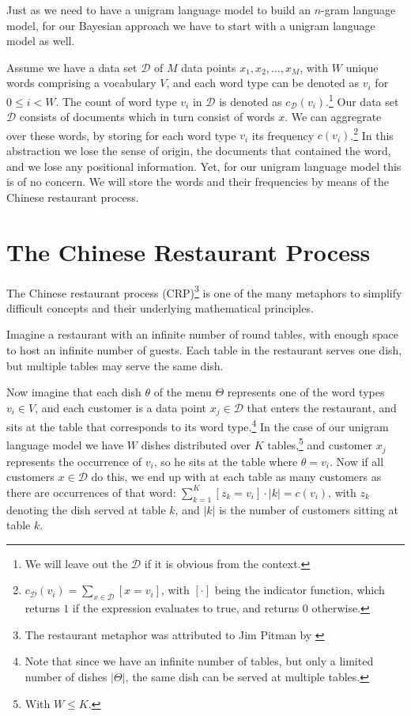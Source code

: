 Just as we need to have a unigram language model to build an $n$-gram language model, for our Bayesian approach we have to start with a unigram language model as well.

Assume we have a data set $\mathcal{D}$ of $M$ data points $x_1, x_2, \ldots, x_M$, with $W$ unique words comprising a vocabulary $V$, and each word type can be denoted as $v_i$ for $0 \leq i < W$. The count of word type $v_i$ in $\mathcal{D}$ is denoted as $c_\mathcal{D}(v_i)$.\footnote{We will leave out the $\mathcal{D}$ if it is obvious from the context.} Our data set $\mathcal{D}$ consists of documents which in turn consist of words $x$. We can aggregrate over these words, by storing for each word type $
v_i$ its frequency $c(v_i)$.\footnote{$c_\mathcal{D}(v_i) = \sum_{x\in\mathcal{D}} [x = v_i]$, with $[\cdot]$ being the indicator function, which returns $1$ if the expression evaluates to true, and returns $0$ otherwise.} In this abstraction we lose the sense of origin, the documents that contained the word, and we lose any positional information. Yet, for our unigram language model this is of no concern. We will store the words and their frequencies by means of the Chinese restaurant process.

\section{The Chinese Restaurant Process}
The Chinese restaurant process (CRP)\footnote{The restaurant metaphor was attributed to Jim Pitman by \cite{Aldous1985Exchangeability}} is one of the many metaphors to simplify difficult concepts and their underlying mathematical principles. 

Imagine a restaurant with an infinite number of round tables, with enough space to host an infinite number of guests. Each table in the restaurant serves one dish, but multiple tables may serve the same dish.

Now imagine that each dish $\theta$ of the menu $\Theta$ represents one of the word types $v_i \in V$, and each customer is a data point $x_j\in\mathcal{D}$ that enters the restaurant, and sits at the table that corresponds to its word type.\footnote{Note that since we have an infinite number of tables, but only a limited number of dishes $|\Theta|$, the same dish can be served at multiple tables.} In the case of our unigram language model we have $W$ dishes distributed over $K$ tables,\footnote{With $W\leq K$.} and customer $x_j$ represents the occurrence of $v_i$, so he sits at the table where $\theta = 
v_i$. Now if all customers $x\in\mathcal{D}$ do this, we end up with at each table as many customers as there are occurrences of that word: $\sum_{k=1}^K[z_k=v_i]\cdot|k| = c(v_i)$, with $z_k$ denoting the dish served at table $k$, and $|k|$ is the number of customers sitting at table $k$.

